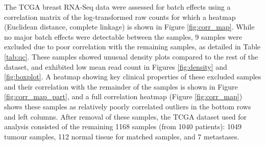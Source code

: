 The TCGA breast RNA-Seq data were assessed for batch effects using a correlation matrix of the log-transformed raw counts for which a heatmap (Euclidean distance, complete linkage) is shown in Figure \ref{fig:corr_map}. While no major batch effects were detectable between the samples, 9 samples were excluded due to poor correlation with the remaining samples, as detailed in Table \ref{tab:qc}. These samples showed unusual density plots compared to the rest of the dataset, and exhibited low mean read count in Figures \ref{fig:density} and \ref{fig:boxplot}. A heatmap showing key clinical properties of these excluded samples and their correlation with the remainder of the samples is shown in Figure \ref{fig:corr_map_part}, and a full correlation heatmap (Figure \ref{fig:corr_map}) shows these samples as relatively poorly correlated outliers in the bottom rows and left columns.
After removal of these samples, the TCGA dataset used for analysis consisted of the remaining 1168 samples (from 1040 patients): 1049 tumour samples, 112 normal tissue for matched samples, and 7 metastases.

